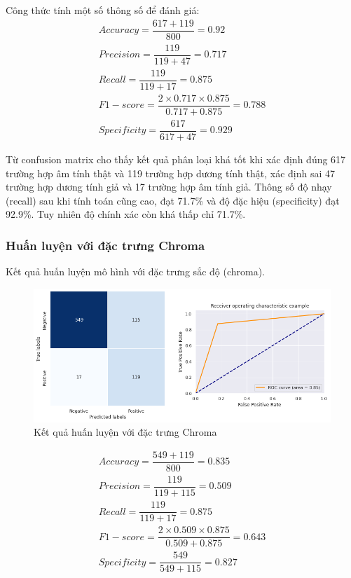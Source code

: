 \documentclass[a4paper, 12pt]{article}
\begin{document}
Công thức tính một số thông số để đánh giá:
\begin{align*}
    Accuracy = \dfrac{617+119}{800} = 0.92\\
    Precision = \dfrac{119}{119+47} = 0.717\\
    Recall = \dfrac{119}{119+17} = 0.875\\
    F1-score = \dfrac{2\times0.717\times0.875}{0.717+0.875} = 0.788\\
    Specificity = \dfrac{617}{617+47}=0.929
\end{align*}

Từ confusion matrix cho thấy kết quả phân loại khá tốt khi xác định đúng 617 trường hợp âm tính thật và 119 trường hợp dương tính thật, xác định sai 47 trường hợp dương tính giả và 17 trường hợp âm tính giả. Thông số độ nhạy (recall) sau khi tính toán cũng cao, đạt 71.7\% và độ đặc hiệu (specificity) đạt 92.9\%. Tuy nhiên độ chính xác còn khá thấp chỉ 71.7\%.

\subsubsection{Huấn luyện với đặc trưng Chroma}
\noindent
Kết quả huấn luyện mô hình với đặc trưng sắc độ (chroma).

\begin{figure}[!h]
\captionsetup{width=0.8\textwidth}
\centering
\includegraphics[width=17cm]{images/5.2.png}
\caption{Kết quả huấn luyện với đặc trưng Chroma}
\end{figure}

\begin{align*}
    Accuracy = \dfrac{549+119}{800} = 0.835\\
    Precision = \dfrac{119}{119+115} = 0.509\\
    Recall = \dfrac{119}{119+17} = 0.875\\
    F1-score = \dfrac{2\times0.509\times0.875}{0.509+0.875} = 0.643\\
    Specificity = \dfrac{549}{549+115}=0.827
\end{align*}
\end{document}
